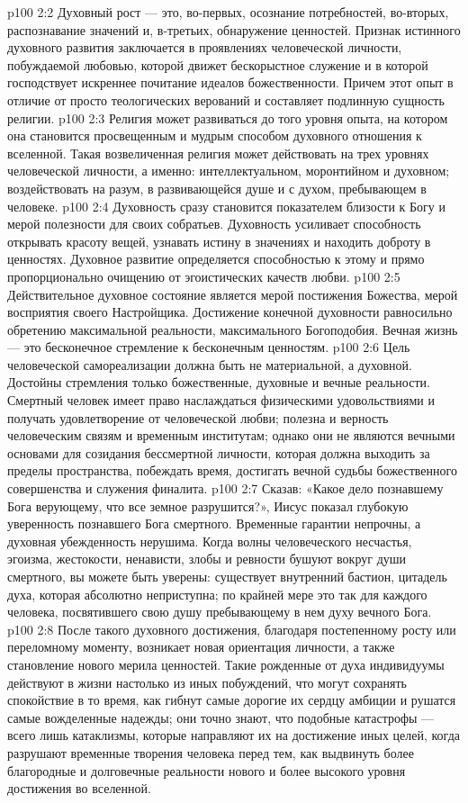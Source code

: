 \vs p100 2:2 Духовный рост --- это, во\hyp{}первых, осознание потребностей, во\hyp{}вторых, распознавание значений и, в\hyp{}третьих, обнаружение ценностей. Признак истинного духовного развития заключается в проявлениях человеческой личности, побуждаемой любовью, которой движет бескорыстное служение и в которой господствует искреннее почитание идеалов божественности. Причем этот опыт в отличие от просто теологических верований и составляет подлинную сущность религии.
\vs p100 2:3 Религия может развиваться до того уровня опыта, на котором она становится просвещенным и мудрым способом духовного отношения к вселенной. Такая возвеличенная религия может действовать на трех уровнях человеческой личности, а именно: интеллектуальном, моронтийном и духовном; воздействовать на разум, в развивающейся душе и с духом, пребывающем в человеке.
\vs p100 2:4 \pc Духовность сразу становится показателем близости к Богу и мерой полезности для своих собратьев. Духовность усиливает способность открывать красоту вещей, узнавать истину в значениях и находить доброту в ценностях. Духовное развитие определяется способностью к этому и прямо пропорционально очищению от эгоистических качеств любви.
\vs p100 2:5 Действительное духовное состояние является мерой постижения Божества, мерой восприятия своего Настройщика. Достижение конечной духовности равносильно обретению максимальной реальности, максимального Богоподобия. Вечная жизнь --- это бесконечное стремление к бесконечным ценностям.
\vs p100 2:6 \pc Цель человеческой самореализации должна быть не материальной, а духовной. Достойны стремления только божественные, духовные и вечные реальности. Смертный человек имеет право наслаждаться физическими удовольствиями и получать удовлетворение от человеческой любви; полезна и верность человеческим связям и временным институтам; однако они не являются вечными основами для созидания бессмертной личности, которая должна выходить за пределы пространства, побеждать время, достигать вечной судьбы божественного совершенства и служения финалита.
\vs p100 2:7 Сказав: «Какое дело познавшему Бога верующему, что все земное разрушится?», Иисус показал глубокую уверенность познавшего Бога смертного. Временные гарантии непрочны, а духовная убежденность нерушима. Когда волны человеческого несчастья, эгоизма, жестокости, ненависти, злобы и ревности бушуют вокруг души смертного, вы можете быть уверены: существует внутренний бастион, цитадель духа, которая абсолютно неприступна; по крайней мере это так для каждого человека, посвятившего свою душу пребывающему в нем духу вечного Бога.
\vs p100 2:8 После такого духовного достижения, благодаря постепенному росту или переломному моменту, возникает новая ориентация личности, а также становление нового мерила ценностей. Такие рожденные от духа индивидуумы действуют в жизни настолько из иных побуждений, что могут сохранять спокойствие в то время, как гибнут самые дорогие их сердцу амбиции и рушатся самые вожделенные надежды; они точно знают, что подобные катастрофы --- всего лишь катаклизмы, которые направляют их на достижение иных целей, когда разрушают временные творения человека перед тем, как выдвинуть более благородные и долговечные реальности нового и более высокого уровня достижения во вселенной.
